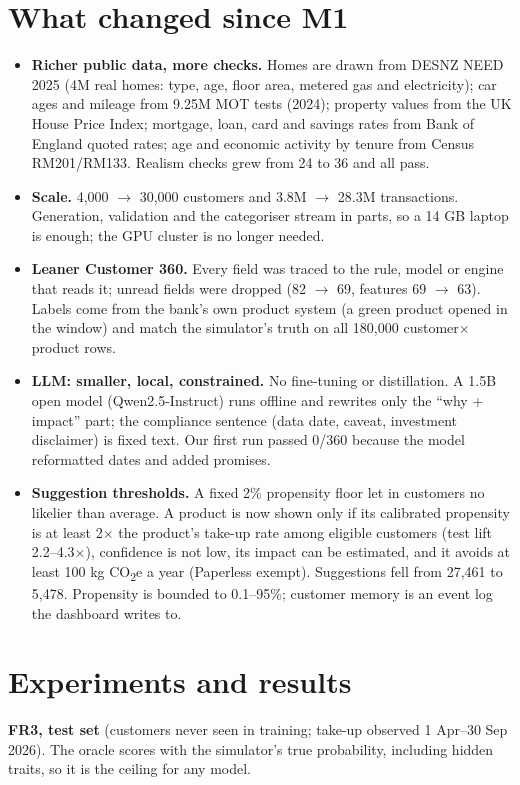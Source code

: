 \documentclass[10pt,a4paper]{article}
\newcommand{\co}{CO\textsubscript{2}e}
\begin{document}
\section{What changed since M1}
\begin{itemize}
  \item \textbf{Richer public data, more checks.} Homes are drawn from DESNZ NEED 2025 (4M real homes: type, age, floor
        area, metered gas and electricity); car ages and mileage from 9.25M MOT tests (2024); property values from the UK
        House Price Index; mortgage, loan, card and savings rates from Bank of England quoted rates; age and economic activity
        by tenure from Census RM201/RM133. Realism checks grew from 24 to 36 and all pass.
  \item \textbf{Scale.} 4,000 $\rightarrow$ 30,000 customers and 3.8M $\rightarrow$ 28.3M transactions. Generation, validation
        and the categoriser stream in parts, so a 14 GB laptop is enough; the GPU cluster is no longer needed.
  \item \textbf{Leaner Customer 360.} Every field was traced to the rule, model or engine that reads it; unread fields were
        dropped (82 $\rightarrow$ 69, features 69 $\rightarrow$ 63). Labels come from the bank's own product system (a green
        product opened in the window) and match the simulator's truth on all 180,000 customer$\times$product rows.
  \item \textbf{LLM: smaller, local, constrained.} No fine-tuning or distillation. A 1.5B open model (Qwen2.5-Instruct)
        runs offline and rewrites only the ``why + impact'' part; the compliance sentence (data date, caveat, investment
        disclaimer) is fixed text. Our first run passed 0/360 because the model reformatted dates and added promises.
  \item \textbf{Suggestion thresholds.} A fixed 2\% propensity floor let in customers no likelier than average. A product
        is now shown only if its calibrated propensity is at least 2$\times$ the product's take-up rate among eligible
        customers (test lift 2.2--4.3$\times$), confidence is not low, its impact can be estimated, and it avoids at least
        100 kg \co{} a year (Paperless exempt). Suggestions fell from 27,461 to 5,478. Propensity is bounded to 0.1--95\%;
        customer memory is an event log the dashboard writes to.
\end{itemize}

\section{Experiments and results}
\textbf{FR3, test set} (customers never seen in training; take-up observed 1 Apr--30 Sep 2026). The oracle scores with the
simulator's true probability, including hidden traits, so it is the ceiling for any model.
\end{document}

